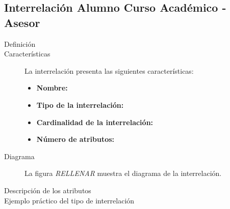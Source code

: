\subsection{Interrelación Alumno Curso Académico - Asesor}

   \begin{description}
      \item[Definición]

      \item[Características] La interrelación presenta las siguientes
                             características:

         \begin{itemize}
            \item \textbf{Nombre:}
            \item \textbf{Tipo de la interrelación:}
            \item \textbf{Cardinalidad de la interrelación:}
            \item \textbf{Número de atributos:}
         \end{itemize}

      \item[Diagrama] La figura \textit{RELLENAR} muestra el diagrama de la
                      interrelación.

      \item[Descripción de los atributos]

      \item[Ejemplo práctico del tipo de interrelación]
   \end{description}

